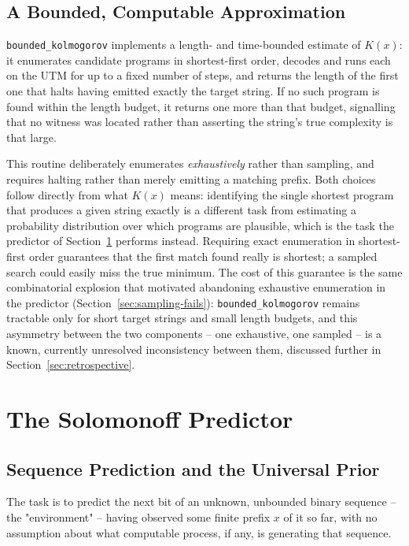 \documentclass[11pt]{article}
\begin{document}
\subsection{A Bounded, Computable Approximation}

\texttt{bounded\_kolmogorov} implements a length- and time-bounded estimate of $K(x)$: it
enumerates candidate programs in shortest-first order, decodes and runs each on the UTM
for up to a fixed number of steps, and returns the length of the first one that halts
having emitted exactly the target string. If no such program is found within the length
budget, it returns one more than that budget, signalling that no witness was located
rather than asserting the string's true complexity is that large.

This routine deliberately enumerates \emph{exhaustively} rather than sampling, and
requires halting rather than merely emitting a matching prefix. Both choices follow
directly from what $K(x)$ means: identifying the single shortest program that produces a
given string exactly is a different task from estimating a probability distribution over
which programs are plausible, which is the task the predictor of
Section~\ref{sec:predictor} performs instead. Requiring exact enumeration in shortest-first
order guarantees that the first match found really is shortest; a sampled search could
easily miss the true minimum. The cost of this guarantee is the same combinatorial
explosion that motivated abandoning exhaustive enumeration in the predictor
(Section~\ref{sec:sampling-fails}): \texttt{bounded\_kolmogorov} remains tractable only for
short target strings and small length budgets, and this asymmetry between the two
components -- one exhaustive, one sampled -- is a known, currently unresolved
inconsistency between them, discussed further in Section~\ref{sec:retrospective}.

\section{The Solomonoff Predictor}
\label{sec:predictor}

\subsection{Sequence Prediction and the Universal Prior}

The task is to predict the next bit of an unknown, unbounded binary sequence -- the
"environment" -- having observed some finite prefix $x$ of it so far, with no assumption
about what computable process, if any, is generating that sequence.
\end{document}
